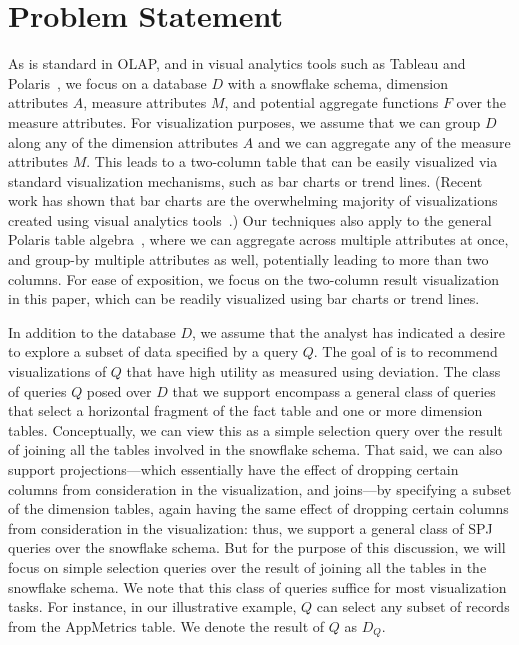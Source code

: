\section{Problem Statement}
\label{sec:problem_statement}

As is standard in OLAP, and in visual analytics tools such as Tableau and Polaris~\cite{tableau,polaris},
we focus on a database $D$ with a snowflake schema,
dimension attributes $A$, measure attributes $M$, and potential
aggregate functions $F$ over the measure attributes. 
For visualization purposes, we assume that we can group $D$ along any of the dimension attributes $A$ 
and we can aggregate any of the measure attributes $M$.
This leads to a two-column table that can be easily visualized
via standard visualization mechanisms, such as bar charts or trend lines.
(Recent work has shown that bar charts are the overwhelming majority of visualizations
created using visual analytics tools~\cite{DBLP:journals/pvldb/MortonBGM14}.) 
Our techniques also apply to the general Polaris table algebra~\cite{polaris}, where
we can aggregate across multiple attributes at once, and group-by multiple attributes as well, 
potentially leading to more than two columns.
For ease of exposition, we focus on the two-column result visualization in this paper,
which can be readily visualized using bar charts or trend lines.

In addition to the database $D$, we assume that the analyst has indicated
a desire to explore a subset of data specified by a query $Q$.
The goal of \SeeDB is to recommend visualizations of $Q$ that have
high utility as measured using deviation. 
The class of queries $Q$ posed over $D$ that we support encompass a general class of queries 
that select a horizontal fragment of the fact table and one or more dimension tables.
Conceptually, we can view this as a simple selection query over the result of joining all
the tables involved in the snowflake schema. 
That said, we can also support projections---which essentially have the effect
of dropping certain columns from consideration in the visualization, and
joins---by specifying a subset of the dimension tables, again having 
the same effect of dropping certain columns from consideration in the visualization: thus,
we support a general class of SPJ queries over the snowflake schema.
But for the purpose of this discussion, we will focus on simple selection
queries over the result of joining all the tables in the snowflake schema.
We note that this class of queries 
suffice for most visualization tasks.
For instance, in our illustrative example, $Q$ can select any subset of records from the
AppMetrics table. 
We denote the result of $Q$ as $D_Q$.


